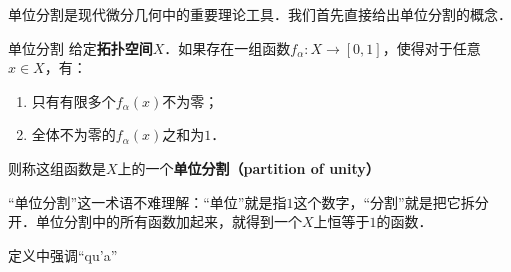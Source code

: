 

单位分割是现代微分几何中的重要理论工具．我们首先直接给出单位分割的概念．

\begin{definition}{单位分割}
给定\textbf{拓扑空间}$X$．如果存在一组函数$f_\alpha: X \to [0, 1]$，使得对于任意$x\in X$，有：
\begin{enumerate}
\item 只有有限多个$f_\alpha(x)$不为零；
\item 全体不为零的$f_\alpha(x)$之和为$1$．
\end{enumerate}
则称这组函数是$X$上的一个\textbf{单位分割（partition of unity）}
\end{definition}

“单位分割”这一术语不难理解：“单位”就是指$1$这个数字，“分割”就是把它拆分开．单位分割中的所有函数加起来，就得到一个$X$上恒等于$1$的函数．

定义中强调“qu'a”







